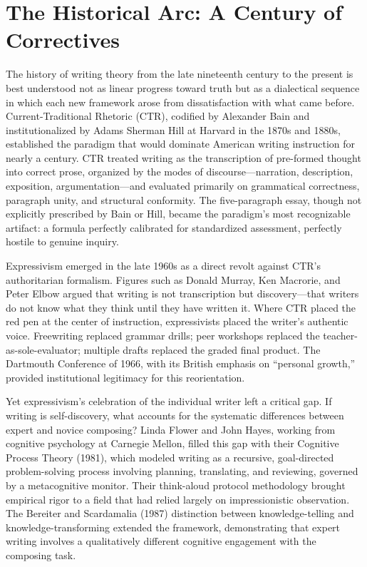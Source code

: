 \documentclass[12pt]{article}
\begin{document}
\section{The Historical Arc: A Century of Correctives}

The history of writing theory from the late nineteenth century to the present is best understood not as linear progress toward truth but as a dialectical sequence in which each new framework arose from dissatisfaction with what came before. Current-Traditional Rhetoric (CTR), codified by Alexander Bain and institutionalized by Adams Sherman Hill at Harvard in the 1870s and 1880s, established the paradigm that would dominate American writing instruction for nearly a century. CTR treated writing as the transcription of pre-formed thought into correct prose, organized by the modes of discourse---narration, description, exposition, argumentation---and evaluated primarily on grammatical correctness, paragraph unity, and structural conformity. The five-paragraph essay, though not explicitly prescribed by Bain or Hill, became the paradigm's most recognizable artifact: a formula perfectly calibrated for standardized assessment, perfectly hostile to genuine inquiry.

Expressivism emerged in the late 1960s as a direct revolt against CTR's authoritarian formalism. Figures such as Donald Murray, Ken Macrorie, and Peter Elbow argued that writing is not transcription but discovery---that writers do not know what they think until they have written it. Where CTR placed the red pen at the center of instruction, expressivists placed the writer's authentic voice. Freewriting replaced grammar drills; peer workshops replaced the teacher-as-sole-evaluator; multiple drafts replaced the graded final product. The Dartmouth Conference of 1966, with its British emphasis on ``personal growth,'' provided institutional legitimacy for this reorientation.

Yet expressivism's celebration of the individual writer left a critical gap. If writing is self-discovery, what accounts for the systematic differences between expert and novice composing? Linda Flower and John Hayes, working from cognitive psychology at Carnegie Mellon, filled this gap with their Cognitive Process Theory (1981), which modeled writing as a recursive, goal-directed problem-solving process involving planning, translating, and reviewing, governed by a metacognitive monitor. Their think-aloud protocol methodology brought empirical rigor to a field that had relied largely on impressionistic observation. The Bereiter and Scardamalia (1987) distinction between knowledge-telling and knowledge-transforming extended the framework, demonstrating that expert writing involves a qualitatively different cognitive engagement with the composing task.
\end{document}
